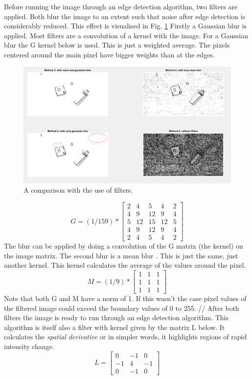 \documentclass[11pt]{article}
\begin{document}
\noindent Before running the image through an edge detection algorithm, two filters are applied. Both blur the image to an extent such that noise after edge detection is considerably reduced. This effect is visualised in Fig. \ref{fig:filter_comparison}
Firstly a Gaussian blur is applied. Most filters are a convolution of a kernel with the image. For a Gaussian blur the G kernel below is used. This is just a weighted average. The pixels centered around the main pixel have bigger weights than at the edges.
\begin{figure}[h]
	\center
  \includegraphics[width=0.7\linewidth]{filter_comparison.png}
  \caption{A comparison with the use of filters.}
  \label{fig:filter_comparison}
\end{figure}

\begin{equation}
  G = (1/159) * 
  \begin{bmatrix}
   2 & 4 & 5 & 4 & 2\\
   4 & 9 & 12 & 9 & 4\\
   5 & 12 & 15 & 12 & 5\\
   4 & 9 & 12 & 9& 4\\
   2 & 4 & 5 & 4 & 2
  \end{bmatrix}
\end{equation}
The blur can be applied by doing a convolution of the G matrix (the kernel) on the image matrix.
The second blur is a mean blur \cite{mean}. This is just the same, just another kernel. This kernel calculates the average of the values around the pixel.
\begin{equation}
M = (1/9) * 
\begin{bmatrix}
	1&1&1\\
	1&1&1\\
	1&1&1
\end{bmatrix}
\end{equation}
Note that both G and M have a norm of 1. If this wasn't the case pixel values of the filtered image could exceed the boundary values of 0 to 255. //
After both filters the image is ready to run through an edge detection algorithm\cite{edge_detection}. This algorithm is itself also a filter with kernel given by the matrix L below.
It calculates the \textit{spatial  derivative} or in simpler words, it highlights regions of rapid intensity change.
\begin{equation}
L =\begin{bmatrix}
	0&-1&0\\
	-1&4&-1\\
	0&-1&0
\end{bmatrix}
\end{equation}
\end{document}
